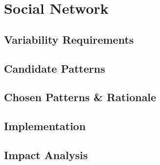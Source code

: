 \section{Social Network}\label{sec:fa_social_network}

\subsection{Variability Requirements}\label{sec:fa_social_network_variability_requirements}

\subsection{Candidate Patterns}\label{sec:fa_social_network_candidate_patterns}

\subsection{Chosen Patterns \& Rationale}\label{sec:fa_social_network_chosen_patterns_rationale}

\subsection{Implementation}\label{sec:fa_social_network_implementation}

\subsection{Impact Analysis}\label{sec:fa_social_network_impact_analysis}

